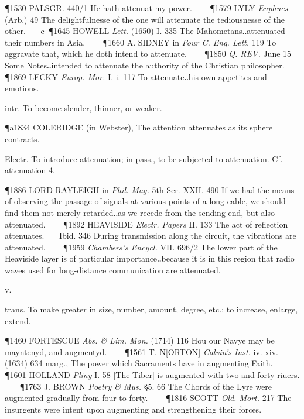\begin{description}[wide, labelwidth=!, labelindent=0pt]
\begin{myenumerate}
\P 1530 PALSGR.  440/1 He hath attenuat my power.    
\P 1579 LYLY  \textit{Euphues} (Arb.) 49 The delightfulnesse of the one will attenuate the tediousnesse of the other.    c 
\P 1645 HOWELL  \textit{Lett.} (1650) I. 335 The Mahometans‥attenuated their numbers in Asia.    
\P 1660 A. SIDNEY in \textit{Four C. Eng. Lett.} 119 To aggravate that, which he doth intend to attenuate.    
\P 1850 \textit{Q. REV.}  June 15 Some Notes‥intended to attenuate the authority of the Christian philosopher.    
\P 1869 LECKY  \textit{Europ. Mor.} I. i. 117 To attenuate‥his own appetites and emotions.

 intr. To become slender, thinner, or weaker.

\P a1834 COLERIDGE  (in Webster), The attention attenuates as its sphere contracts.

 Electr. To introduce attenuation; in pass., to be subjected to attenuation. Cf. attenuation 4.

\P 1886 LORD RAYLEIGH  in \textit{Phil. Mag.} 5th Ser. XXII. 490 If we had the means of observing the passage of signals at various points of a long cable, we should find them not merely retarded‥as we recede from the sending end, but also attenuated.    
\P 1892 HEAVISIDE  \textit{Electr. Papers} II. 133 The act of reflection attenuates.    Ibid. 346 During transmission along the circuit, the vibrations are attenuated.    
\P 1959 \textit{Chambers's Encycl.} VII. 696/2 The lower part of the Heaviside layer is of particular importance‥because it is in this region that radio waves used for long-distance communication are attenuated.
\end{myenumerate}

 v.

\noindent {}

\vspace{-0.3cm}

\begin{myenumerate}

 trans. To make greater in size, number, amount, degree, etc.; to increase, enlarge, extend.

\P 1460 FORTESCUE  \textit{Abs. \& Lim. Mon.} (1714) 116 Hou our Navye may be mayntenyd, and augmentyd.    
\P 1561 T. N[ORTON]  \textit{Calvin's Inst.} iv. xiv. (1634) 634 marg., The power which Sacraments have in augmenting Faith.    
\P 1601 HOLLAND  \textit{Pliny} I. 58 [The Tiber] is augmented with two and forty riuers.    
\P 1763 J. BROWN  \textit{Poetry \& Mus.} §5. 66 The Chords of the Lyre were augmented gradually from four to forty.    
\P 1816 SCOTT  \textit{Old. Mort.} 217 The insurgents were intent upon augmenting and strengthening their forces.


\end{myenumerate}
\end{description}
